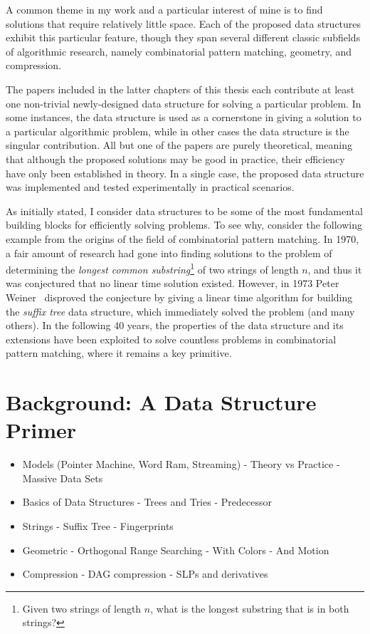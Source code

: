 A common theme in my work and a particular interest of mine is to find solutions that require relatively little space. Each of the proposed data structures exhibit this particular feature, though they span several different classic subfields of algorithmic research, namely combinatorial pattern matching, geometry, and compression. 

The papers included in the latter chapters of this thesis each contribute at least one non-trivial newly-designed data structure for solving a particular problem. In some instances, the data structure is used as a cornerstone in giving a solution to a particular algorithmic problem, while in other cases the data structure is the singular contribution. All but one of the papers are purely theoretical, meaning that although the proposed solutions may be good in practice, their efficiency have only been established in theory. In a single case, the proposed data structure was implemented and tested experimentally in practical scenarios.

As initially stated, I consider data structures to be some of the most fundamental building blocks for efficiently solving problems. To see why, consider the following example from the origins of the field of combinatorial pattern matching. In 1970, a fair amount of research had gone into finding solutions to the problem of determining the \emph{longest common substring}\footnote{Given two strings of length $n$, what is the longest substring that is in both strings?} of two strings of length $n$, and thus it was conjectured that no linear time solution existed. However, in 1973 Peter Weiner~\cite{weiner1973linear} disproved the conjecture by giving a linear time algorithm for building the \emph{suffix tree} data structure, which immediately solved the problem (and many others). In the following 40 years, the properties of the data structure and its extensions have been exploited to solve countless problems in combinatorial pattern matching, where it remains a key primitive.



\section{Background: A Data Structure Primer}

\begin{itemize}
    \item Models (Pointer Machine, Word Ram, Streaming)
        - Theory vs Practice
        - Massive Data Sets
    \item Basics of Data Structures
        - Trees and Tries
        - Predecessor
    \item Strings
        - Suffix Tree
        - Fingerprints
    \item Geometric
        - Orthogonal Range Searching
        - With Colors
        - And Motion
    \item Compression
        - DAG compression
        - SLPs and derivatives
\end{itemize}



